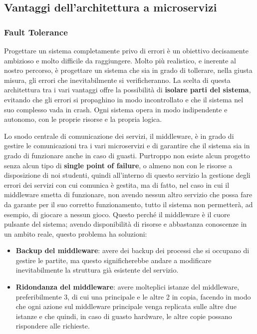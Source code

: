 
\subsection{Vantaggi dell'architettura a microservizi}

\subsubsection{Fault Tolerance}

Progettare un sistema completamente privo di errori è un obiettivo decisamente ambizioso e molto difficile da raggiungere. 
Molto più realistico, e inerente al nostro percorso, è progettare un sistema che sia in grado di tollerare, nella giusta misura, gli errori che inevitabilmente si verificheranno. 
La scelta di questa architettura tra i vari vantaggi offre la possibilità di \textbf{isolare parti del sistema}, evitando che gli errori si propaghino in modo incontrollato e che il sistema nel suo complesso vada in crash. 
Ogni sistema opera in modo indipendente e autonomo, con le proprie risorse e la propria logica.

Lo snodo centrale di comunicazione dei servizi, il middleware, è in grado di gestire le comunicazioni tra i vari microservizi e di garantire che il sistema sia in grado di funzionare anche in caso di guasti.
Purtroppo non esiste alcun progetto senza alcun tipo di \textbf{single point of failure}, o almeno non con le risorse a disposizione di noi studenti, quindi all'interno di questo servizio la 
gestione degli errori dei servizi con cui comunica è gestita, ma di fatto, nel caso in cui il middleware smetta di funzionare, non avendo nessun altro servizio che possa fare da garante 
per il suo corretto funzionamento, tutto il sistema non permetterà, ad esempio, di giocare a nessun gioco.
Questo perché il middleware è il cuore pulsante del sistema; avendo disponibilità di risorse e abbastanza conoscenze in un ambito reale, questo problema ha soluzioni: 
\begin{itemize}
    \item \textbf{Backup del middleware}: avere dei backup dei processi che si occupano di gestire le partite, ma questo significherebbe andare a modificare inevitabilmente 
    la struttura già esistente del servizio.
    \item \textbf{Ridondanza del middleware}: avere molteplici istanze del middleware, preferibilmente 3, di cui una principale e le altre 2 in copia, facendo in modo che
    ogni azione sul middleware principale venga replicata sulle altre due istanze e che quindi, in caso di guasto hardware, le altre copie possano rispondere alle richieste.
\end{itemize}

